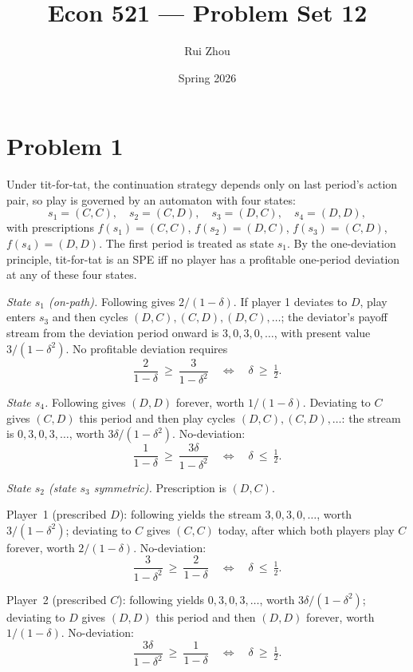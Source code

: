 \documentclass[11pt]{article}
\title{Econ 521 --- Problem Set 12}
\author{Rui Zhou}
\date{Spring 2026}
\begin{document}
\maketitle

\section*{Problem 1}

Under tit-for-tat, the continuation strategy depends only on last period's action pair, so play is governed by an automaton with four states:
\[
s_1=(C,C),\quad s_2=(C,D),\quad s_3=(D,C),\quad s_4=(D,D),
\]
with prescriptions $f(s_1)=(C,C)$, $f(s_2)=(D,C)$, $f(s_3)=(C,D)$, $f(s_4)=(D,D)$. The first period is treated as state $s_1$. By the one-deviation principle, tit-for-tat is an SPE iff no player has a profitable one-period deviation at any of these four states.

\smallskip
\emph{State $s_1$ (on-path).} Following gives $2/(1-\delta)$. If player 1 deviates to $D$, play enters $s_3$ and then cycles $(D,C),(C,D),(D,C),\ldots$; the deviator's payoff stream from the deviation period onward is $3,0,3,0,\ldots$, with present value $3/(1-\delta^2)$. No profitable deviation requires
\[
\frac{2}{1-\delta}\ \ge\ \frac{3}{1-\delta^2}
\quad\Longleftrightarrow\quad \delta\ \ge\ \tfrac{1}{2}.
\]

\emph{State $s_4$.} Following gives $(D,D)$ forever, worth $1/(1-\delta)$. Deviating to $C$ gives $(C,D)$ this period and then play cycles $(D,C),(C,D),\ldots$: the stream is $0,3,0,3,\ldots$, worth $3\delta/(1-\delta^2)$. No-deviation:
\[
\frac{1}{1-\delta}\ \ge\ \frac{3\delta}{1-\delta^2}
\quad\Longleftrightarrow\quad \delta\ \le\ \tfrac{1}{2}.
\]

\emph{State $s_2$ (state $s_3$ symmetric).} Prescription is $(D,C)$.

Player~1 (prescribed $D$): following yields the stream $3,0,3,0,\ldots$, worth $3/(1-\delta^2)$; deviating to $C$ gives $(C,C)$ today, after which both players play $C$ forever, worth $2/(1-\delta)$. No-deviation:
\[
\frac{3}{1-\delta^2}\ \ge\ \frac{2}{1-\delta}
\quad\Longleftrightarrow\quad \delta\ \le\ \tfrac{1}{2}.
\]

Player~2 (prescribed $C$): following yields $0,3,0,3,\ldots$, worth $3\delta/(1-\delta^2)$; deviating to $D$ gives $(D,D)$ this period and then $(D,D)$ forever, worth $1/(1-\delta)$. No-deviation:
\[
\frac{3\delta}{1-\delta^2}\ \ge\ \frac{1}{1-\delta}
\quad\Longleftrightarrow\quad \delta\ \ge\ \tfrac{1}{2}.
\]
\end{document}
